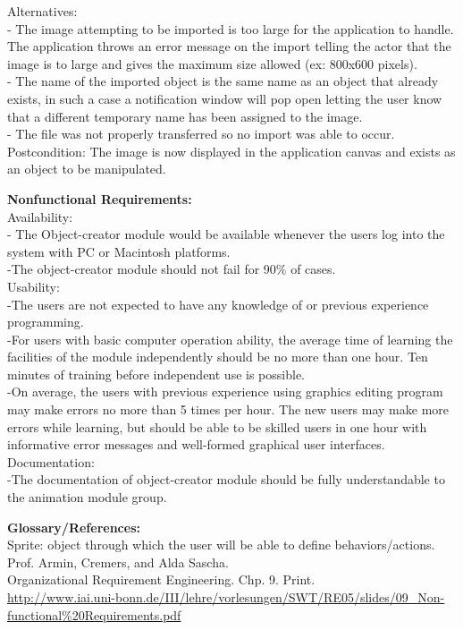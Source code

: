 \documentclass[12pt]{report}
\begin{document}
Alternatives:\\
- The image attempting to be imported is too large for the application to handle. The application throws an error message on the import telling the actor that the image is to large and gives the maximum size allowed (ex: 800x600 pixels). \\
- The name of the imported object is the same name as an object that already exists, in such a case a notification window will pop open letting the user know that a different temporary name has been assigned to the image. \\
- The file was not properly transferred so no import was able to occur.\\
Postcondition:  The image is now displayed in the application canvas and exists as an object to be manipulated.

\pagebreak




{\bf\large Nonfunctional Requirements:}\\[1\baselineskip]
Availability: \\
- The Object-creator module would be available whenever the users log into the system with PC or Macintosh platforms.\\
-The object-creator module should not fail for 90\% of cases.\\[0\baselineskip]

Usability: \\
-The users are not expected to have any knowledge of or previous experience programming.\\
-For users with basic computer operation ability, the average time of learning the facilities of the module independently should be no more than one hour. Ten minutes of training before independent use is possible. \\
-On average, the users with previous experience using graphics editing program may make errors no more than 5 times per hour. The new users may make more errors while learning, but should be able to be skilled users in one hour with informative error messages and well-formed graphical user interfaces.\\[0\baselineskip]

Documentation:\\
-The documentation of object-creator module should be fully understandable to the animation module group.\\
\pagebreak

{\bf\large Glossary/References:}\\[1\baselineskip]
Sprite: object through which the user will be able to define behaviors/actions.
\\[1\baselineskip]
Prof. Armin, Cremers, and Alda Sascha. \\
Organizational Requirement Engineering. Chp. 9. Print.\\
\url{http://www.iai.uni-bonn.de/III/lehre/vorlesungen/SWT/RE05/slides/09_Non-functional\%20Requirements.pdf}
\end{document}
